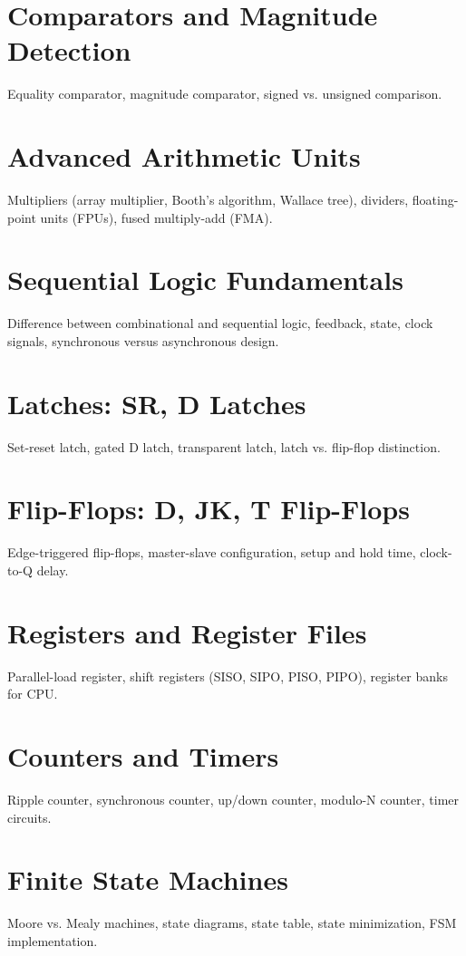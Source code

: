 \chapter{Comparators and Magnitude Detection}
Equality comparator, magnitude comparator, signed vs. unsigned comparison.

\chapter{Advanced Arithmetic Units}
Multipliers (array multiplier, Booth's algorithm, Wallace tree), dividers, floating-point units (FPUs), fused multiply-add (FMA).


\chapter{Sequential Logic Fundamentals}
Difference between combinational and sequential logic, feedback, state, clock signals, synchronous versus asynchronous design.

\chapter{Latches: SR, D Latches}
Set-reset latch, gated D latch, transparent latch, latch vs. flip-flop distinction.

\chapter{Flip-Flops: D, JK, T Flip-Flops}
Edge-triggered flip-flops, master-slave configuration, setup and hold time, clock-to-Q delay.

\chapter{Registers and Register Files}
Parallel-load register, shift registers (SISO, SIPO, PISO, PIPO), register banks for CPU.

\chapter{Counters and Timers}
Ripple counter, synchronous counter, up/down counter, modulo-N counter, timer circuits.

\chapter{Finite State Machines}
Moore vs. Mealy machines, state diagrams, state table, state minimization, FSM implementation.

